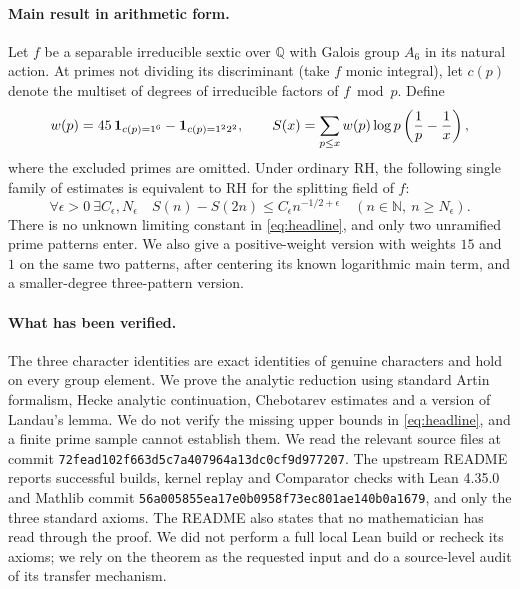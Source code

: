 \documentclass[11pt,letterpaper]{article}
\theoremstyle{remark}\newtheorem{remark}[theorem]{Remark}
\newcommand{\Q}{\mathbb Q}\newcommand{\C}{\mathbb C}\newcommand{\R}{\mathbb R}
\begin{document}
\paragraph{Main result in arithmetic form.}
Let $f$ be a separable irreducible sextic over $\Q$ with Galois group $A_6$ in its natural action. At primes not dividing its discriminant (take $f$ monic integral), let $c(p)$ denote the multiset of degrees of irreducible factors of $f\bmod p$. Define
\[
 w(p)=45\,\mathbf1_{c(p)=1^6}-\mathbf1_{c(p)=1^2 2^2},
 \qquad S(x)=\sum_{p\le x}w(p)\log p\left(\frac1p-\frac1x\right),
\]
where the excluded primes are omitted. Under ordinary RH, the following single family of estimates is equivalent to RH for the splitting field of $f$:
\begin{equation}\label{eq:headline}
  \forall\epsilon>0\ \exists C_\epsilon,N_\epsilon\quad
  S(n)-S(2n)\le C_\epsilon n^{-1/2+\epsilon}
  \quad(n\in\mathbb N,\ n\ge N_\epsilon).
\end{equation}
There is no unknown limiting constant in \eqref{eq:headline}, and only two unramified prime patterns enter. We also give a positive-weight version with weights $15$ and $1$ on the same two patterns, after centering its known logarithmic main term, and a smaller-degree three-pattern version.

\paragraph{What has been verified.}
The three character identities are exact identities of genuine characters and hold on every group element. We prove the analytic reduction using standard Artin formalism, Hecke analytic continuation, Chebotarev estimates and a version of Landau's lemma. We do not verify the missing upper bounds in \eqref{eq:headline}, and a finite prime sample cannot establish them. We read the relevant source files at commit \nolinkurl{72fead102f663d5c7a407964a13dc0cf9d977207}. The upstream README reports successful builds, kernel replay and Comparator checks with Lean 4.35.0 and Mathlib commit \nolinkurl{56a005855ea17e0b0958f73ec801ae140b0a1679}, and only the three standard axioms. The README also states that no mathematician has read through the proof. We did not perform a full local Lean build or recheck its axioms; we rely on the theorem as the requested input and do a source-level audit of its transfer mechanism.
\end{document}
